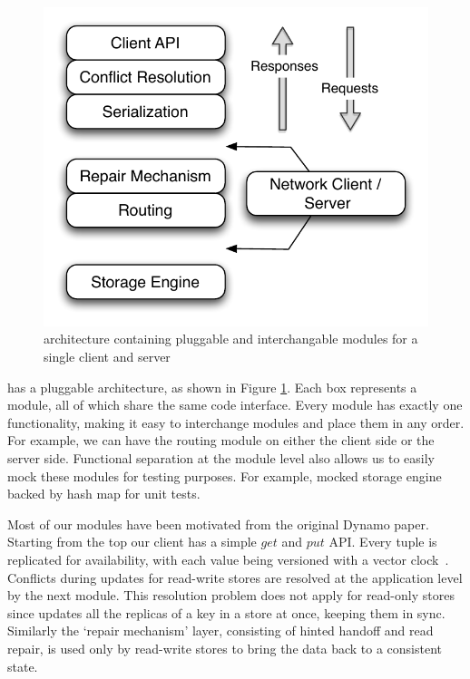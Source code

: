 \begin{figure}
  \centering
    \includegraphics[scale=0.55]{images/arch.pdf}
  \caption{\projectname{} architecture containing pluggable and interchangable modules for a single client and server}
  \label{arch}
\end{figure}

\projectname{} has a pluggable architecture, as shown in Figure \ref{arch}. Each box represents a module, all of which share the same code interface. Every module has exactly one functionality, making it easy to interchange modules and place them in any order. For example, we can have the routing module on either the client side or the server side. Functional separation at the module level also allows us to easily mock these modules for testing purposes. For example, mocked storage engine backed by hash map for unit tests. 

Most of our modules have been motivated from the original Dynamo paper. Starting from the top our client has a simple $get$ and $put$ API. Every tuple is replicated for availability, with each value being versioned with a vector clock~\cite{lamport}. Conflicts during updates for read-write stores are resolved at the application level by the next module. This resolution problem does not apply for read-only stores since \projectname{} updates all the replicas of a key in a store at once, keeping them in sync. Similarly the `repair mechanism' layer, consisting of hinted handoff and read repair, is used only by read-write stores to bring the data back to a consistent state. 

